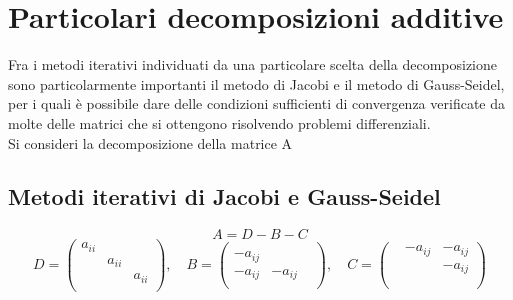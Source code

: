 

\section{Particolari decomposizioni additive}
Fra i metodi iterativi individuati da una particolare scelta della
decomposizione sono particolarmente importanti il metodo di Jacobi e
il metodo di Gauss-Seidel, per i quali \`e possibile dare delle
condizioni sufficienti di convergenza verificate da molte delle
matrici che si ottengono risolvendo problemi differenziali.\\
Si consideri la decomposizione della matrice A

\subsection{Metodi iterativi di Jacobi e Gauss-Seidel}

$$ A = D- B -C $$
$$ D = \begin{pmatrix}
a_{ii}  &         &         \\
        & a_{ii}  &         \\
        &         & a_{ii}  \\
\end{pmatrix},
\quad
B = 
 \begin{pmatrix}
        &         &         \\
-a_{ij} &         &         \\
-a_{ij} & -a_{ij} &         \\
\end{pmatrix}, 
\quad 
C = 
 \begin{pmatrix}
        & -a_{ij} & -a_{ij} \\
        &         & -a_{ij} \\
        &         &         \\
\end{pmatrix} $$

